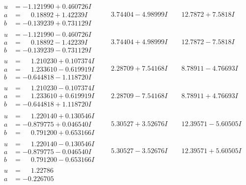 \documentclass[1p]{elsarticle_modified}
\theoremstyle{definition}
\begin{document}
$$\begin{array}{c|c|c}
\begin{aligned}
u &= -1.121990 + 0.460726 I \\
a &= \phantom{-}0.18892 + 1.42239 I \\
b &= -0.139239 + 0.731129 I\end{aligned}
 & \phantom{-}3.74404 - 4.98999 I & \phantom{-}12.7872 + 7.5818 I \\ \hline\begin{aligned}
u &= -1.121990 - 0.460726 I \\
a &= \phantom{-}0.18892 - 1.42239 I \\
b &= -0.139239 - 0.731129 I\end{aligned}
 & \phantom{-}3.74404 + 4.98999 I & \phantom{-}12.7872 - 7.5818 I \\ \hline\begin{aligned}
u &= \phantom{-}1.210230 + 0.107374 I \\
a &= \phantom{-}1.233610 - 0.619919 I \\
b &= -0.644818 - 1.118720 I\end{aligned}
 & \phantom{-}2.28709 + 7.54168 I & \phantom{-}8.78911 - 4.76693 I \\ \hline\begin{aligned}
u &= \phantom{-}1.210230 - 0.107374 I \\
a &= \phantom{-}1.233610 + 0.619919 I \\
b &= -0.644818 + 1.118720 I\end{aligned}
 & \phantom{-}2.28709 - 7.54168 I & \phantom{-}8.78911 + 4.76693 I \\ \hline\begin{aligned}
u &= \phantom{-}1.220140 + 0.130546 I \\
a &= -0.879775 + 0.046540 I \\
b &= \phantom{-}0.791200 + 0.653166 I\end{aligned}
 & \phantom{-}5.30527 + 3.52676 I & \phantom{-}12.39571 - 5.60505 I \\ \hline\begin{aligned}
u &= \phantom{-}1.220140 - 0.130546 I \\
a &= -0.879775 - 0.046540 I \\
b &= \phantom{-}0.791200 - 0.653166 I\end{aligned}
 & \phantom{-}5.30527 - 3.52676 I & \phantom{-}12.39571 + 5.60505 I \\ \hline\begin{aligned}
u &= \phantom{-}1.22786\phantom{ +0.000000I} \\
a &= -0.226705\phantom{ +0.000000I} \\

\end{aligned}
\end{array}$$
\end{document}
